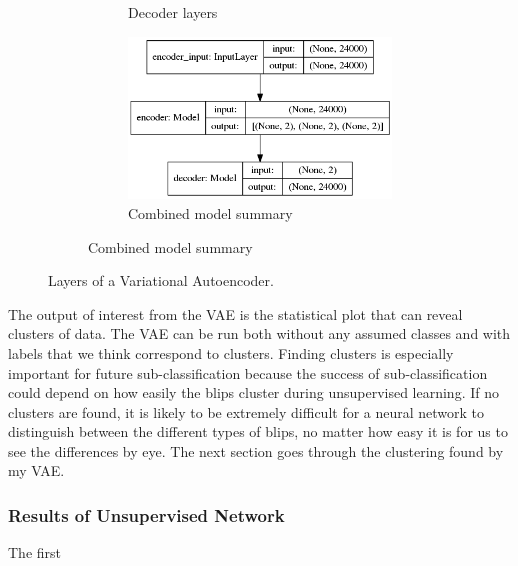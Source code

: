 \documentclass[a4paper]{article}
\begin{document}
\begin{figure}[h!]
\begin{subfigure}{.49\textwidth}
\begin{subfigure}{.6\textwidth}
			\caption{Decoder layers}
			\label{fig:vae_decoder}
		\end{subfigure}
		\vspace{10mm}%
		\begin{subfigure}{.8\textwidth}
			\centering
			\includegraphics[width=1\linewidth]{vae_mlp}
			\caption{Combined model summary}
			\label{fig:vae_mlp}
		\end{subfigure}
		\label{fig:decoder}
	\end{subfigure}
	
	\caption{Layers of a Variational Autoencoder.}
	\label{fig:vae}
\end{figure} 

The output of interest from the VAE is the statistical plot that can reveal clusters of data. The VAE can be run both without any assumed classes and with labels that we think correspond to clusters. Finding clusters is especially important for future sub-classification because the success of sub-classification could depend on how easily the blips cluster during unsupervised learning. If no clusters are found, it is likely to be extremely difficult for a neural network to distinguish between the different types of blips, no matter how easy it is for us to see the differences by eye. The next section goes through the clustering found by my VAE.

\subsubsection{Results of Unsupervised Network}

The first 




\end{document}
